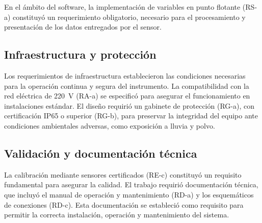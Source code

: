En el ámbito del software, la implementación de variables en punto flotante (RS-a) constituyó un requerimiento obligatorio, necesario para el procesamiento y presentación  de los datos entregados por el sensor. %

\subsection{Infraestructura y protección}

Los requerimientos de infraestructura establecieron las condiciones necesarias para la operación continua y segura del instrumento. La compatibilidad con la red eléctrica de \SI{220}{\volt} (RA-a) se especificó para asegurar el funcionamiento en instalaciones estándar. El diseño requirió un gabinete de protección (RG-a), con certificación IP65 o superior (RG-b), para preservar la integridad del equipo ante condiciones ambientales adversas, como exposición a lluvia y polvo.

\subsection{Validación y documentación técnica}

La calibración mediante sensores certificados (RE-c) constituyó un requisito fundamental para asegurar la calidad. El trabajo requirió documentación técnica, que incluyó el manual de operación y mantenimiento (RD-a) y los esquemáticos de conexiones (RD-c). Esta documentación se estableció como requisito para permitir la correcta instalación, operación y mantenimiento del sistema.




